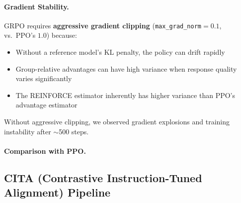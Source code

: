 \paragraph{Gradient Stability.} GRPO requires \textbf{aggressive gradient clipping} (\texttt{max\_grad\_norm}$=0.1$, vs.\ PPO's $1.0$) because:
\begin{itemize}[leftmargin=*]
    \item Without a reference model's KL penalty, the policy can drift rapidly
    \item Group-relative advantages can have high variance when response quality varies significantly
    \item The REINFORCE estimator inherently has higher variance than PPO's advantage estimator
\end{itemize}

Without aggressive clipping, we observed gradient explosions and training instability after $\sim$500 steps.

\paragraph{Comparison with PPO.}
\begin{table}[ht!]
\centering
{}
\caption{Key differences between the PPO and GRPO training pipelines.}
\label{tab:ppo_vs_grpo_comparison}
\end{table}

\subsection{CITA (Contrastive Instruction-Tuned Alignment) Pipeline}
\label{sec:appendix_cita_pipeline}


